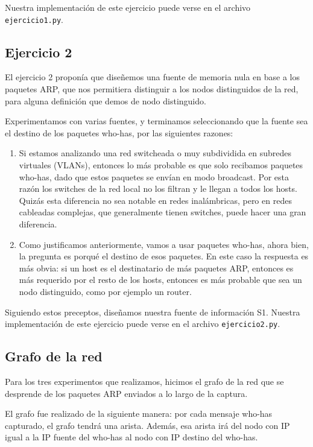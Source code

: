 Nuestra implementación de este ejercicio puede verse en el archivo \texttt{ejercicio1.py}.


\subsection{Ejercicio 2}

El ejercicio 2 proponía que diseñemos una fuente de memoria nula en base a los paquetes ARP, que nos permitiera distinguir a los nodos distinguidos de la red, para alguna definición que demos de nodo distinguido.

Experimentamos con varias fuentes, y terminamos seleccionando que la fuente sea el destino de los paquetes who-has, por las siguientes razones:

\begin{enumerate}
  \item Si estamos analizando una red switcheada o muy subdividida en subredes virtuales (VLANs), entonces lo más probable es que solo recibamos paquetes who-has, dado que estos paquetes se envían en modo broadcast.
    Por esta razón los switches de la red local no los filtran y le llegan a todos los hosts. Quizás esta diferencia no sea notable en redes inalámbricas, pero en redes cableadas complejas, que generalmente tienen switches, puede hacer una gran diferencia.
  \item Como justificamos anteriormente, vamos a usar paquetes who-has, ahora bien, la pregunta es porqu\'e el destino de esos paquetes. En este caso la respuesta es más obvia: si un host es el destinatario de más paquetes ARP, entonces es más requerido por el resto de los hosts, entonces es más probable que sea un nodo distinguido, como por ejemplo un router.
\end{enumerate}

Siguiendo estos preceptos, diseñamos nuestra fuente de información S1. Nuestra implementación de este ejercicio puede verse en el archivo \texttt{ejercicio2.py}.

\subsection{Grafo de la red}

Para los tres experimentos que realizamos, hicimos el grafo de la red que se desprende de los paquetes ARP enviados a lo largo de la captura.

El grafo fue realizado de la siguiente manera: por cada mensaje who-has capturado, el grafo tendrá una arista. Además, esa arista irá del nodo con IP igual a la IP fuente del who-has al nodo con IP destino del who-has.

